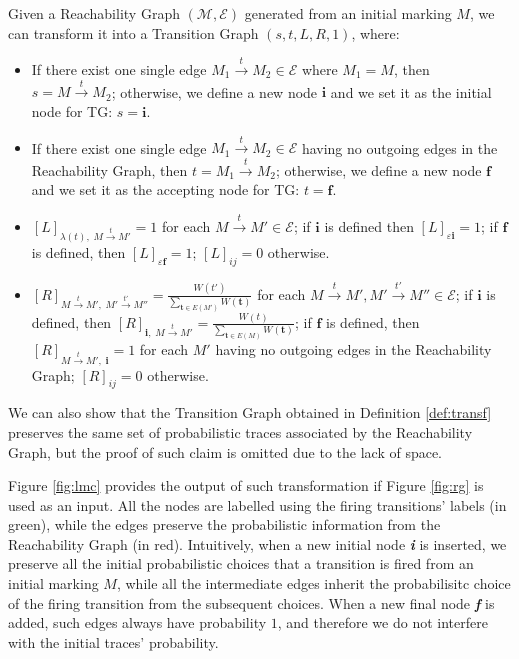 \begin{definition}\label{def:transf}
Given a Reachability Graph $(\mathcal{M},\mathcal{E})$ generated from an initial marking $M$, we can transform it into a Transition Graph $(s,t,L,R,1)$, where:
\begin{itemize}
	\item If there exist one single edge $M_1\overset{t}{\to}M_2\in\mathcal{E}$ where $M_1=M$, then $s=M\overset{t}{\to}M_2$; otherwise, we define a new node $\textbf{i}$ and we set it as the initial node for TG: $s=\textbf{i}$.
	\item If there exist one single edge $M_1\overset{t}{\to}M_2\in\mathcal{E}$ having no outgoing edges in the Reachability Graph, then $t=M_1\overset{t}{\to}M_2$; otherwise, we define a new node $\textbf{f}$ and we set it as the accepting node for TG:  $t=\textbf{f}$.
	\item $[L]_{\lambda(t),\;M\overset{t}{\to} M'}=1$ for each $M\overset{t}{\to} M'\in\mathcal{E}$; if $\textbf{i}$ is defined then $[L]_{\varepsilon\textbf{i}}=1$; if $\textbf{f}$ is defined, then $[L]_{\varepsilon\textbf{f}}=1$; $[L]_{ij}=0$ otherwise.
	\item $[R]_{M\overset{t}{\to} M',\;M'\overset{t'}{\to} M''}=\frac{W(t')}{\sum_{\textbf{t}\in E(M')}W(\textbf{t})}$ for each $M\overset{t}{\to} M',M'\overset{t'}{\to} M''\in\mathcal{E}$; if $\textbf{i}$ is defined, then $[R]_{\textbf{i},\;M\overset{t}{\to}M'}=\frac{W(t)}{\sum_{\textbf{t}\in E(M)}W(\textbf{t})}$; if $\textbf{f}$ is defined, then $[R]_{M\overset{t}{\to}M',\;\textbf{i}}=1$ for each $M'$ having no outgoing edges in the Reachability Graph; $[R]_{ij}=0$ otherwise.
\end{itemize}
\end{definition}

We can also show that the Transition Graph obtained in Definition \ref{def:transf} preserves the same set of probabilistic traces associated by the Reachability Graph, but the proof of such claim  is omitted due to the lack of space.

\begin{example}
Figure \ref{fig:lmc} provides the output of such transformation if Figure \ref{fig:rg} is used as an input. All the nodes are labelled using the firing transitions' labels (in green), while the edges preserve the probabilistic information from the Reachability Graph (in red). Intuitively, when a new initial node \textit{\textbf{i}} is inserted, we preserve all the initial probabilistic choices that a transition is fired from an initial marking $M$, while all the intermediate edges inherit the probabilisitc choice of the firing transition from the subsequent choices. When a new final node \textit{\textbf{f}} is added, such edges always have probability $1$, and therefore we do not interfere with the initial traces' probability.
\end{example}

